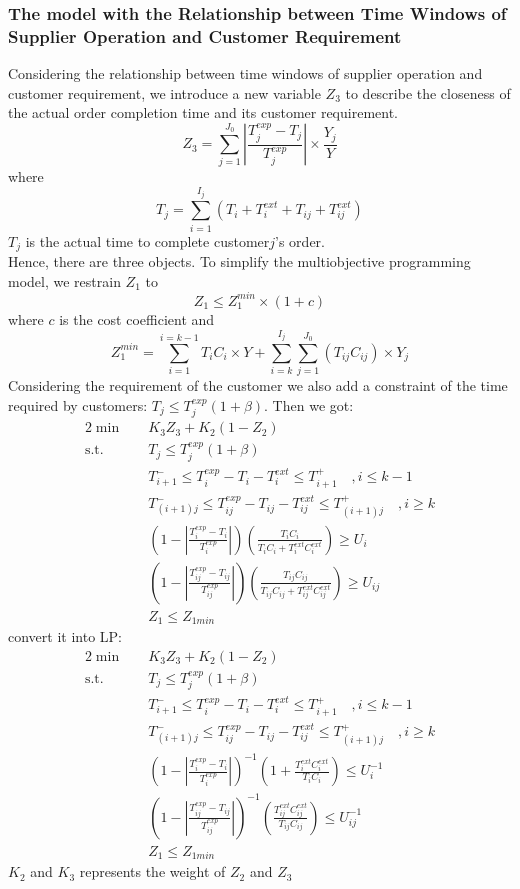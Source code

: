 \documentclass[12pt,a4paper]{article}
\begin{document}
\subsubsection{The model with the Relationship between Time Windows of Supplier Operation and Customer Requirement}
Considering the relationship between time windows of supplier operation and customer requirement, we introduce a new variable $Z_3$ to describe the closeness of the actual order completion time and its customer requirement.
\begin{equation}
	Z_3=\sum_{j=1}^{J_0}|\frac{T_j^{exp}-T_j}{T_j^{exp}}|\times\frac{Y_j}{Y}
\end{equation} 
where
\begin{equation}
	T_j=\sum_{i=1}^{I_j}(T_i+T_i^{ext}+T_{ij}+T_{ij}^{ext})
\end{equation}
$T_j$ is the actual time to complete customer$j$'s order.\\
Hence, there are three objects. To simplify the multiobjective programming model, we restrain $Z_1$ to 
\begin{equation}
 Z_1\leq Z_1^{min}\times(1+c)
\end{equation} 
where $c$ is the cost coefficient and 
\begin{equation}
Z_1^{min}= \sum_{i=1}^{i=k-1}T_iC_i\times Y+\sum_{i=k}^{I_j}\sum_{j=1}^{J_0}(T_{ij}C_{ij})\times Y_j
\end{equation}
Considering the requirement of the customer we also add a constraint of the time required by customers: $T_j\leq T_j^{exp}(1+\beta)$. Then we got:
\begin{alignat}{2}
\min \quad & K_3Z_3+K_2(1-Z_2)\\
\mbox{s.t.}\quad
& T_j\leq T_j^{exp}(1+\beta)\\
& T_{i+1}^-\leq T_i^{exp}-T_i-T_i^{ext}\leq T_{i+1}^+ \quad ,i\leq k-1\\
& T_{(i+1)j}^-\leq T_{ij}^{exp}-T_{ij}-T_{ij}^{ext}\leq T_{(i+1)j}^+ \quad, i\geq k\\
& (1-|\frac{T_i^{exp}-T_i}{T_i^{exp}}|)(\frac{T_iC_i}{T_iC_i+T_i^{ext}C_i^{ext}})\geq U_i\\
& (1-|\frac{T_{ij}^{exp}-T_{ij}}{T_{ij}^{exp}}|)(\frac{T_{ij}C_{ij}}{T_{ij}C_{ij}+T_{ij}^{ext}C_{ij}^{ext}})\geq U_{ij}\\
& Z_1\leq Z_{1min}
\end{alignat}
convert it into LP:
\begin{alignat}{2}
\min \quad & K_3Z_3+K_2(1-Z_2)\\
\mbox{s.t.}\quad
& T_j\leq T_j^{exp}(1+\beta)\\
& T_{i+1}^-\leq T_i^{exp}-T_i-T_i^{ext}\leq T_{i+1}^+ \quad ,i\leq k-1\\
& T_{(i+1)j}^-\leq T_{ij}^{exp}-T_{ij}-T_{ij}^{ext}\leq T_{(i+1)j}^+ \quad, i\geq k\\
& (1-|\frac{T_i^{exp}-T_i}{T_i^{exp}}|)^{-1}(1+\frac{T_i^{ext}C_i^{ext}}{T_iC_i})\leq U_i^{-1}\\
& (1-|\frac{T_{ij}^{exp}-T_{ij}}{T_{ij}^{exp}}|)^{-1}(\frac{T_{ij}^{ext}C_{ij}^{ext}}{T_{ij}C_{ij}})\leq U_{ij}^{-1}\\
& Z_1\leq Z_{1min}
\end{alignat}
$K_2$ and $K_3$ represents the weight of $Z_2$ and $Z_3$
\end{document}

